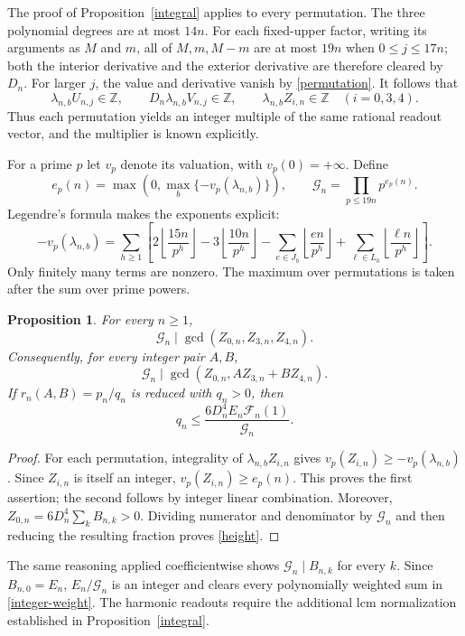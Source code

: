 \documentclass[11pt]{article}
\newcommand{\Z}{\mathbb Z}
\newcommand{\F}{\mathcal F}
\newtheorem{proposition}{Proposition}
\begin{document}
The proof of Proposition~\ref{integral} applies to every permutation.
The three polynomial degrees are at most $14n$. For each fixed-upper
factor, writing its arguments as $M$ and $m$, all of $M,m,M-m$ are
at most $19n$ when $0\leq j\leq17n$; both the interior derivative and
the exterior derivative are therefore cleared by $D_n$.
For larger $j$, the value and derivative vanish by
\eqref{permutation}. It follows that
\[
 \lambda_{n,b}U_{n,j}\in\Z,\qquad
 D_n\lambda_{n,b}V_{n,j}\in\Z,
 \qquad \lambda_{n,b}Z_{i,n}\in\Z\quad(i=0,3,4).
\]
Thus each permutation yields an integer multiple of the same rational
readout vector, and the multiplier is known explicitly.

For a prime $p$ let $v_p$ denote its valuation, with $v_p(0)=+\infty$.
Define
\begin{equation}\label{divisor}
 e_p(n)=\max\left(0,\max_b\{-v_p(\lambda_{n,b})\}\right),\qquad
 \mathcal G_n=\prod_{p\leq19n}p^{e_p(n)}.
\end{equation}
Legendre's formula makes the exponents explicit:
\[
 -v_p(\lambda_{n,b})=\sum_{h\geq1}\left[
 2\left\lfloor\frac{15n}{p^h}\right\rfloor
 -3\left\lfloor\frac{10n}{p^h}\right\rfloor
 -\sum_{e\in J_b}\left\lfloor\frac{en}{p^h}\right\rfloor
 +\sum_{\ell\in L_b}\left\lfloor\frac{\ell n}{p^h}\right\rfloor\right].
\]
Only finitely many terms are nonzero. The maximum over permutations
is taken after the sum over prime powers.

\begin{proposition}\label{gcd}
For every $n\geq1$,
\[
 \mathcal G_n\mid\gcd(Z_{0,n},Z_{3,n},Z_{4,n}).
\]
Consequently, for every integer pair $A,B$,
\[
 \mathcal G_n\mid\gcd(Z_{0,n},AZ_{3,n}+BZ_{4,n}).
\]
If $r_n(A,B)=p_n/q_n$ is reduced with $q_n>0$, then
\begin{equation}\label{height}
 q_n\leq\frac{6D_n^4E_n\F_n(1)}{\mathcal G_n}.
\end{equation}
\end{proposition}
\begin{proof}
For each permutation, integrality of $\lambda_{n,b}Z_{i,n}$ gives
$v_p(Z_{i,n})\geq-v_p(\lambda_{n,b})$. Since $Z_{i,n}$ is itself an
integer, $v_p(Z_{i,n})\geq e_p(n)$. This proves the first assertion;
the second follows by integer linear combination.
Moreover, $Z_{0,n}=6D_n^4\sum_kB_{n,k}>0$.
Dividing numerator and denominator by $\mathcal G_n$ and then reducing
the resulting fraction proves \eqref{height}.
\end{proof}

The same reasoning applied coefficientwise shows
$\mathcal G_n\mid B_{n,k}$ for every $k$. Since $B_{n,0}=E_n$,
$E_n/\mathcal G_n$ is an integer and clears every polynomially weighted
sum in \eqref{integer-weight}. The harmonic readouts require the
additional lcm normalization established in Proposition~\ref{integral}.
\end{document}
